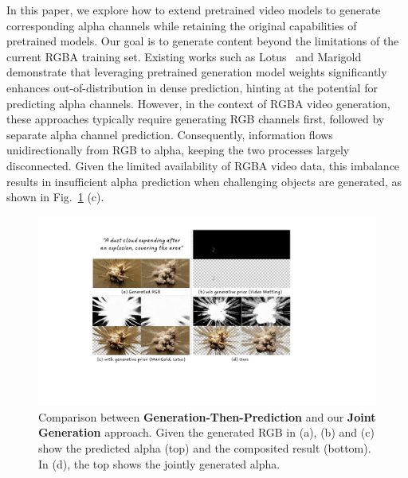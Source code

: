In this paper, we explore how to extend pretrained video models to generate corresponding alpha channels while retaining the original capabilities of pretrained models. Our goal is to generate content beyond the limitations of the current RGBA training set.
Existing works such as Lotus~\cite{he2024lotus} and Marigold~\cite{ke2024repurposing} demonstrate that leveraging pretrained generation model weights significantly enhances out-of-distribution in dense prediction, hinting at the potential for predicting alpha channels.
However, in the context of RGBA video generation, these approaches typically require generating RGB channels first, followed by separate alpha channel prediction. Consequently, information flows unidirectionally from RGB to alpha, keeping the two processes largely disconnected.
Given the limited availability of RGBA video data, this imbalance results in insufficient alpha prediction when challenging objects are generated, as shown in Fig.~\ref{fig-intro} (c).

\begin{figure}[t]
    \centering
    \includegraphics[width=1.0\linewidth]{figs/intro.pdf}
    \vspace{-0.2in}
    \caption{Comparison between \textbf{Generation-Then-Prediction} and our \textbf{Joint Generation} approach. Given the generated RGB in (a), (b) and (c) show the predicted alpha (top) and the composited result (bottom). In (d), the top shows the jointly generated alpha.}
    \label{fig-intro}
    \vspace{-0.2in}
\end{figure}

